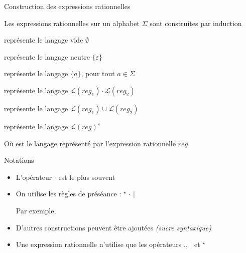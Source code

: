 
\begingroup

\begin{frame}{Construction des expressions rationnelles}
  
  Les expressions rationnelles sur un alphabet $\Sigma$ sont construites par induction
  
  \begin{description}[xxxxxxxxxxx]
  \item[$\emptyset$ :] représente le langage vide \alert{$\emptyset$}
  \item[$\varepsilon$ :] représente le langage neutre \alert{$\{\varepsilon\}$}
  \item[$a$ :] représente le langage \alert{$\{a\}$}, pour tout $a\in \Sigma$
  \item[$\mathit{reg}_1 \cdot \mathit{reg}_2$ :] représente le langage \alert{$\mathcal{L}(\mathit{reg}_1) \cdot \mathcal{L}(\mathit{reg}_2)$}
  \item[$\mathit{reg}_1 \mid \mathit{reg}_2$ :] représente le langage \alert{$\mathcal{L}(\mathit{reg}_1) \cup \mathcal{L}(\mathit{reg}_2)$}
  \item[$\mathit{reg}^\star$ :] représente le langage \alert{$\mathcal{L}(\mathit{reg})^\star$}
  \end{description}

  Où  est le langage représenté par l'expression rationnelle $\mathit{reg}$

  \pause
  \begin{block}{Notations}
    \begin{itemize}
    \item L'opérateur \alert{$\cdot$} est le plus souvent 
    \item On utilise les règles de \alert{préséance} : \quad
       \alert{${}^\star$} \quad
       \alert{$\cdot$}   \quad
       \alert{$|$}
      \begin{center}
        Par exemple, 
      \end{center}
    \item D'autres constructions peuvent être ajoutées \emph{(sucre syntaxique)}
      \begin{center}
         \quad\quad
      \end{center}
    \item Une expression rationnelle  n'utilise que les opérateurs \alert{$.$}, \alert{$|$} et \alert{${}^\star$}
    \end{itemize}
  \end{block}
  
\end{frame}

\endgroup
\endinput
